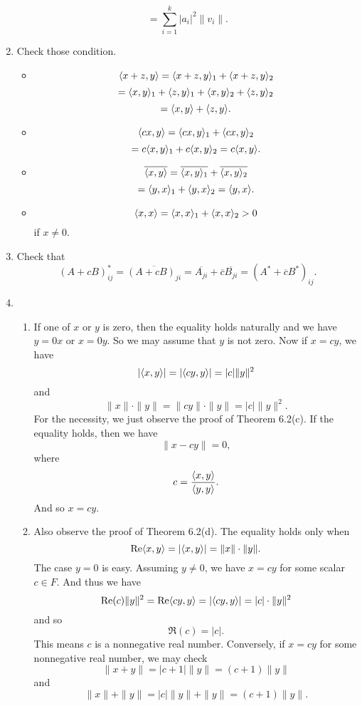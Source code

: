 \begin{enumerate}
\[=\sum_{i=1}^k{|a_i|^2\|v_i\|}.\]
\item Check those condition.
\begin{itemize}
\item \[\langle x+z,y\rangle =\langle x+z,y\rangle_1+\langle x+z,y\rangle_2\]
\[=\langle x,y\rangle_1+\langle z,y\rangle_1+\langle x,y\rangle_2+\langle z,y\rangle_2\]
\[=\langle x,y\rangle +\langle z,y\rangle .\]
\item \[\langle cx,y\rangle =\langle cx,y\rangle_1+\langle cx,y\rangle_2\]
\[=c\langle x,y\rangle_1+c\langle x,y\rangle_2=c\langle x,y\rangle .\]
\item \[\overline{\langle x,y\rangle}=\overline{\langle x,y\rangle_1}+\overline{\langle x,y\rangle_2}\]
\[=\langle y,x\rangle_1+\langle y,x\rangle_2=\langle y,x\rangle .\]
\item \[\langle x,x\rangle =\langle x,x\rangle_1+\langle x,x\rangle_2>0\]
if $x\neq 0$.
\end{itemize}
\item Check that 
\[(A+cB)^*_{ij}=\overline{(A+cB)_{ji}}=\overline{A_{ji}}+\overline{c}\overline{B_{ji}}=(A^*+\overline{c}B^*)_{ij}.\]
\item \begin{enumerate}
\item If one of $x$ or $y$ is zero, then the equality holds naturally and we have $y=0x$ or $x=0y$. So we may assume that $y$ is not zero. Now if $x=cy$, we have 
\[|\langle x,y\rangle |=|\langle cy,y\rangle|=|c|\|y\|^2\]
and 
\[\|x\|\cdot \|y\|=\|cy\|\cdot \|y\|=|c|\|y\|^2.\]
For the necessity, we just observe the proof of Theorem 6.2(c). If the equality holds, then we have 
\[\|x-cy\|=0,\]
where 
\[c=\frac{\langle x,y\rangle}{\langle y,y\rangle}.\]
And so $x=cy$.
\item Also observe the proof of Theorem 6.2(d). The equality holds only when 
\[\operatorname{Re}\langle x,y\rangle =|\langle x,y\rangle |=\|x\|\cdot \|y\|.\]
The case $y=0$ is easy. Assuming $y\neq 0$, we have $x=cy$ for some scalar $c\in F$. And thus we have
\[\operatorname{Re}(c)\|y\|^2=\operatorname{Re}\langle cy,y\rangle =|\langle cy,y\rangle |=|c|\cdot \|y\|^2\]
and so 
\[\Re(c)=|c|.\]
This means $c$ is a nonnegative real number. Conversely, if $x=cy$ for some nonnegative real number, we may check 
\[\|x+y\|=|c+1|\|y\|=(c+1)\|y\|\]
and 
\[\|x\|+\|y\|=|c|\|y\|+\|y\|=(c+1)\|y\|.\]


\end{enumerate}
\end{enumerate}
